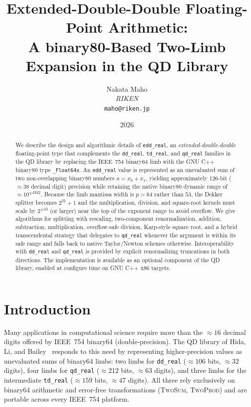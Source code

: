 \documentclass[11pt,a4paper]{article}
\title{%
  Extended-Double-Double Floating-Point Arithmetic: \\
  A binary80-Based Two-Limb Expansion in the QD Library%
}
\author{%
  Nakata Maho \\
  \textit{RIKEN} \\
  \texttt{maho@riken.jp}%
}
\date{2026}
\begin{document}
\maketitle

\begin{abstract}
We describe the design and algorithmic details of \texttt{edd\_real},
an \emph{extended-double-double} floating-point type that
complements the \texttt{dd\_real}, \texttt{td\_real}, and
\texttt{qd\_real} families in the QD library by replacing the
IEEE~754 binary64 limb with the GNU C++ binary80 type
\texttt{\_Float64x}.  An \texttt{edd\_real} value is represented as
an unevaluated sum of two non-overlapping binary80 numbers
$a = x_0 + x_1$, yielding approximately 126-bit ($\approx 38$
decimal digit) precision while retaining the native binary80
dynamic range of $\approx 10^{\pm 4932}$.  Because the limb
mantissa width is $p = 64$ rather than $53$, the Dekker splitter
becomes $2^{32}+1$ and the multiplication, division, and square-root
kernels must scale by $2^{\pm 33}$ (or larger) near the top of the
exponent range to avoid overflow.  We give algorithms for splitting
with rescaling, two-component renormalization, addition,
subtraction, multiplication, overflow-safe division, Karp-style
square root, and a hybrid transcendental strategy that delegates
to \texttt{qd\_real} whenever the argument is within its safe range
and falls back to native Taylor/Newton schemes otherwise.
Interoperability with \texttt{dd\_real} and \texttt{qd\_real} is
provided by explicit renormalizing truncations in both directions.
The implementation is available as an optional component of the QD
library, enabled at configure time on GNU C++ x86 targets.
\end{abstract}

\section{Introduction}
\label{sec:intro}

Many applications in computational science require more than the
$\approx 16$ decimal digits offered by IEEE~754 binary64
(double-precision).  The QD library of Hida, Li, and
Bailey~\cite{QD,HidaLiBailey2000} responds to this need by
representing higher-precision values as unevaluated sums of
binary64 limbs: two limbs for \texttt{dd\_real}
($\approx 106$ bits, $\approx 32$ digits), four limbs for
\texttt{qd\_real} ($\approx 212$ bits, $\approx 63$ digits), and
three limbs for the intermediate \texttt{td\_real}
($\approx 159$ bits, $\approx 47$ digits).  All three rely
exclusively on binary64 arithmetic and error-free transformations
(\textsc{TwoSum}, \textsc{TwoProd}) and are portable across every
IEEE~754 platform.
\end{document}

